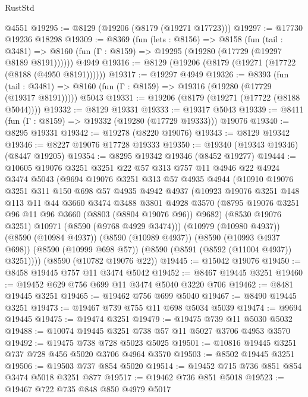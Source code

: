 \begin{lexlean}{RustStd}
\begin{coremodule}
    @4551
@19295 := @8129 (@19206 (@8179 (@19271 @17723)))
@19297 := @17730 @19236 @18298
@19309 := @8369
    (fun (lets : @8156) =>
    @8158
      (fun (tail : @3481) =>
      @8160 (fun (Γ : @8159) => @19295 (@19280 (@17729 (@19297 @8189 @8191))))))
    @4949
@19316 := @8129 (@19206 (@8179 (@19271 (@17722 (@8188 (@4950 @8191))))))
@19317 := @19297 @4949
@19326 := @8393
    (fun (tail : @3481) => @8160 (fun (Γ : @8159) => @19316 (@19280 (@17729 (@19317 @8191)))))
    @5043
@19331 := @19206 (@8179 (@19271 (@17722 (@8188 @5044))))
@19332 := @8129 @19331
@19333 := @19317 @5043
@19339 := @8411 (fun (Γ : @8159) => @19332 (@19280 (@17729 @19333))) @19076
@19340 := @8295 @19331
@19342 := @19278 (@8220 @19076)
@19343 := @8129 @19342
@19346 := @8227 @19076 @17728 @19333
@19350 := @19340 (@19343 @19346) (@8447 @19205)
@19354 := @8295 @19342 @19346 (@8452 @19277)
@19444 := @10605
    @19076
    @3251
    @3251
    @22
    @57
    @313
    @757
    @11
    @4946
    @22
    @4924
    @3474
    @5043
    (@9694
      @19076
      @3251
      @313
      @57
      @4935
      @4944
      (@10910
        @19076
        @3251
        @311
        @150
        @698
        @57
        @4935
        @4942
        @4937
        (@10923
          @19076
          @3251
          @148
          @113
          @11
          @44
          @3660
          @3474
          @3488
          @3801
          @4928
          @3570
          (@8795 @19076 @3251 @96 @11 @96 @3660 (@8803 (@8804 @19076 @96)) @9682)
          (@8530 @19076 @3251)
          @10971
          (@8590 (@9768 @4929 @3474)))
        (@10979 (@10980 @4937))
        (@8590 (@10984 @4937))
        (@8590 (@10989 @4937))
        (@8590 (@10993 @4937 @698))
        (@8590 (@10999 @698 @57))
        (@8590 (@8591 (@8592 (@11004 @4937)) @3251))))
    (@8590 (@10782 @19076 @22))
@19445 := @15042 @19076
@19450 := @8458 @19445 @757 @11 @3474 @5042
@19452 := @8467 @19445 @3251
@19460 := @19452 @629 @756 @699 @11 @3474 @5040 @3220 @706
@19462 := @8481 @19445 @3251
@19465 := @19462 @756 @699 @5040
@19467 := @8490 @19445 @3251
@19473 := @19467 @739 @755 @11 @698 @5034 @5039
@19474 := @9694 @19445
@19475 := @19474 @3251
@19479 := @19475 @739 @11 @5030 @5032
@19488 := @10074 @19445 @3251 @738 @57 @11 @5027 @3706 @4953 @3570
@19492 := @19475 @738 @728 @5023 @5025
@19501 := @10816 @19445 @3251 @737 @728 @456 @5020 @3706 @4964 @3570
@19503 := @8502 @19445 @3251
@19506 := @19503 @737 @854 @5020
@19514 := @19452 @715 @736 @851 @854 @3474 @5018 @3251 @877
@19517 := @19462 @736 @851 @5018
@19523 := @19467 @722 @735 @848 @850 @4979 @5017

\end{coremodule}
\end{lexlean}
